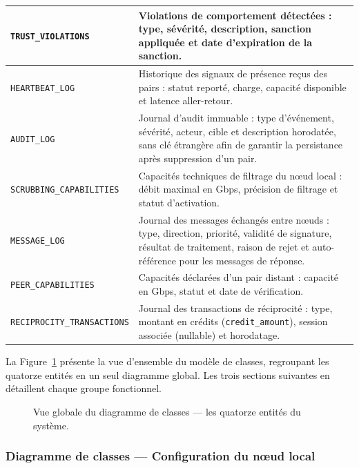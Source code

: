 \begin{longtable}{|
>{\raggedright\arraybackslash}p{5.2cm}|
>{\raggedright\arraybackslash}p{10.2cm}|}
\texttt{TRUST\_VIOLATIONS} &
Violations de comportement détectées : type, sévérité, description, sanction appliquée et date d'expiration de la sanction. \\
\hline

\texttt{HEARTBEAT\_LOG} &
Historique des signaux de présence reçus des pairs : statut reporté, charge, capacité disponible et latence aller-retour. \\
\hline

\texttt{AUDIT\_LOG} &
Journal d'audit immuable : type d'événement, sévérité, acteur, cible et description horodatée, sans clé étrangère afin de garantir la persistance après suppression d'un pair. \\
\hline

\texttt{SCRUBBING\_CAPABILITIES} &
Capacités techniques de filtrage du nœud local : débit maximal en Gbps, précision de filtrage et statut d'activation. \\
\hline

\texttt{MESSAGE\_LOG} &
Journal des messages échangés entre nœuds : type, direction, priorité, validité de signature, résultat de traitement, raison de rejet et auto-référence pour les messages de réponse. \\
\hline

\texttt{PEER\_CAPABILITIES} &
Capacités déclarées d'un pair distant : capacité en Gbps, statut et date de vérification. \\
\hline

\texttt{RECIPROCITY\_TRANSACTIONS} &
Journal des transactions de réciprocité : type, montant en crédits (\texttt{credit\_amount}), session associée (nullable) et horodatage. \\
\hline

\end{longtable}





La Figure~\ref{fig:erd_global} présente la vue d'ensemble du modèle de classes, regroupant les quatorze entités en un seul diagramme global. Les trois sections suivantes en détaillent chaque groupe fonctionnel.

\begin{figure}[H]
\centering
{}
\caption{Vue globale du diagramme de classes — les quatorze entités du système.}
\label{fig:erd_global}
\end{figure}

\clearpage
\FloatBarrier
\subsubsection{Diagramme de classes — Configuration du nœud local}


